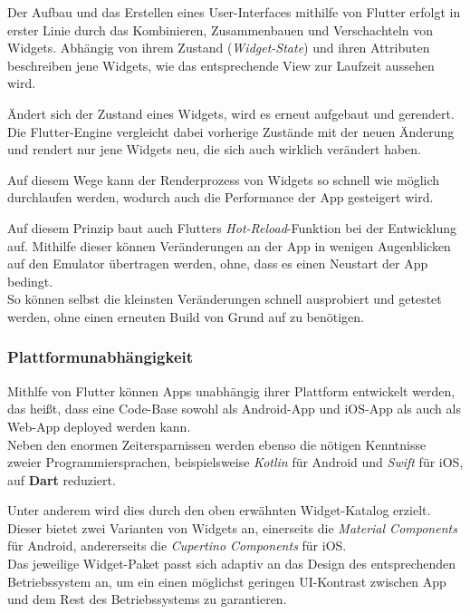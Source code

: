 Der Aufbau und das Erstellen eines User-Interfaces mithilfe von Flutter erfolgt in erster Linie
durch das Kombinieren, Zusammenbauen und Verschachteln von Widgets.
Abhängig von ihrem Zustand (\textit{Widget-State}) und ihren Attributen beschreiben jene Widgets, wie das entsprechende
View zur Laufzeit aussehen wird.

Ändert sich der Zustand eines Widgets, wird es erneut aufgebaut und gerendert. Die Flutter-Engine 
vergleicht dabei vorherige Zustände mit der neuen Änderung und rendert nur jene Widgets neu, die
sich auch wirklich verändert haben.

Auf diesem Wege kann der Renderprozess von Widgets so schnell wie möglich durchlaufen werden, wodurch
auch die Performance der App gesteigert wird.

Auf diesem Prinzip baut auch Flutters \textit{Hot-Reload}-Funktion bei der Entwicklung auf. Mithilfe dieser
können Veränderungen an der App in wenigen Augenblicken auf den Emulator übertragen werden, ohne, dass es einen
Neustart der App bedingt.\\
So können selbst die kleinsten Veränderungen schnell ausprobiert und getestet werden, ohne einen erneuten Build von Grund auf
zu benötigen.

\subsubsection{Plattformunabhängigkeit}

Mithlfe von Flutter können Apps unabhängig ihrer Plattform entwickelt werden, das heißt, dass eine Code-Base
sowohl als Android-App und iOS-App als auch als Web-App deployed werden kann.\\
Neben den enormen Zeitersparnissen werden ebenso die nötigen Kenntnisse zweier Programmiersprachen, beispielsweise
\textit{Kotlin} für Android und \textit{Swift} für iOS, auf \textbf{Dart} reduziert.

Unter anderem wird dies durch den oben erwähnten Widget-Katalog erzielt. Dieser bietet zwei Varianten
von Widgets an, einerseits die \textit{Material Components} für Android, andererseits die \textit{Cupertino Components}
für iOS.\\
Das jeweilige Widget-Paket passt sich adaptiv an das Design des entsprechenden Betriebssystem an, um ein einen möglichst
geringen UI-Kontrast zwischen App und dem Rest des Betriebssystems zu garantieren.


